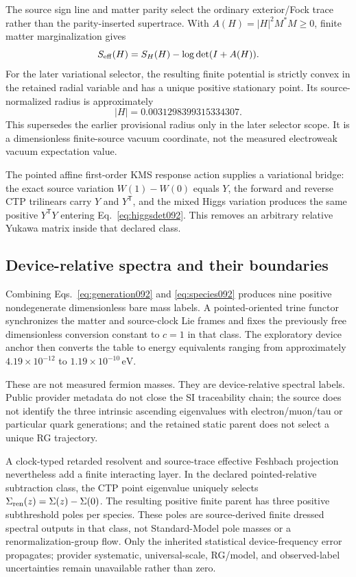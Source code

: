 \documentclass[11pt]{article}
\theoremstyle{definition}
\theoremstyle{remark}
\begin{document}
The source sign line and matter parity select the ordinary exterior/Fock trace rather than the parity-inserted supertrace. With $A(H)=|H|^2M^*M\ge0$, finite matter marginalization gives
\begin{equation}
 S_{\rm eff}(H)=S_H(H)-\log\det(I+A(H)).
 \label{eq:higgsdet092}
\end{equation}
For the later variational selector, the resulting finite potential is strictly convex in the retained radial variable and has a unique positive stationary point. Its source-normalized radius is approximately
\begin{equation}
 |H|=0.0031298399315334307.
\end{equation}
This supersedes the earlier provisional radius only in the later selector scope. It is a dimensionless finite-source vacuum coordinate, not the measured electroweak vacuum expectation value.

The pointed affine first-order KMS response action supplies a variational bridge: the exact source variation $W(1)-W(0)$ equals $Y$, the forward and reverse CTP trilinears carry $Y$ and $Y^{\mathsf T}$, and the mixed Higgs variation produces the same positive $Y^{\mathsf T}Y$ entering Eq.~\eqref{eq:higgsdet092}. This removes an arbitrary relative Yukawa matrix inside that declared class.

\subsection{Device-relative spectra and their boundaries}

Combining Eqs.~\eqref{eq:generation092} and \eqref{eq:species092} produces nine positive nondegenerate dimensionless bare mass labels. A pointed-oriented trine functor synchronizes the matter and source-clock Lie frames and fixes the previously free dimensionless conversion constant to $c=1$ in that class. The exploratory device anchor then converts the table to energy equivalents ranging from approximately $4.19\times10^{-12}$ to $1.19\times10^{-10}\,\mathrm{eV}$.

These are not measured fermion masses. They are device-relative spectral labels. Public provider metadata do not close the SI traceability chain; the source does not identify the three intrinsic ascending eigenvalues with electron/muon/tau or particular quark generations; and the retained static parent does not select a unique RG trajectory.

A clock-typed retarded resolvent and source-trace effective Feshbach projection nevertheless add a finite interacting layer. In the declared pointed-relative subtraction class, the CTP point eigenvalue uniquely selects $\Sigma_{\rm ren}(z)=\Sigma(z)-\Sigma(0)$. The resulting positive finite parent has three positive subthreshold poles per species. These poles are source-derived finite dressed spectral outputs in that class, not Standard-Model pole masses or a renormalization-group flow. Only the inherited statistical device-frequency error propagates; provider systematic, universal-scale, RG/model, and observed-label uncertainties remain unavailable rather than zero.
\end{document}
